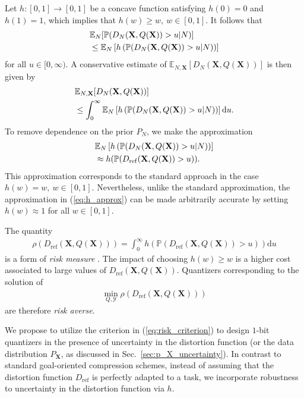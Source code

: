 \documentclass[conference]{IEEEtran}
\begin{document}
Let $h: [0,1] \rightarrow [0,1]$ be a concave function satisfying $h(0) = 0$ and $h(1) = 1$, which implies that $h(w) \geq w,~w \in [0,1]$. It follows that
\begin{align}
	&\mathbb{E}_N[\mathbb{P}(D_N(\mathbf{X},Q(\mathbf{X})) > u|N)]\notag\\
	&\leq \mathbb{E}_N\left[h\left(\mathbb{P}(D_N(\mathbf{X},Q(\mathbf{X})) > u|N)\right)\right]
\end{align}
for all $u \in [0,\infty)$. A conservative estimate of $\mathbb{E}_{N,\mathbf{X}}[D_N(\mathbf{X},Q(\mathbf{X}))]$ is then given by 
\begin{align}
	&\mathbb{E}_{N,\mathbf{X}}[D_N(\mathbf{X},Q(\mathbf{X}))]\notag\\ 
	&\leq \int_0^{\infty} \mathbb{E}_N\left[h\left(\mathbb{P}(D_N(\mathbf{X},Q(\mathbf{X})) > u|N)\right)\right]\mathrm{d}u.
\end{align}
To remove dependence on the prior $P_N$, we make the approximation 
\begin{align}\label{eq:h_approx}
	&\mathbb{E}_N\left[h\left(\mathbb{P}(D_N(\mathbf{X},Q(\mathbf{X})) > u|N)\right)\right]\notag\\
	&\approx h(\mathbb{P}(D_{\mathrm{ref}}(\mathbf{X},Q(\mathbf{X})) > u)).
\end{align}
This approximation corresponds to the standard approach in the case $h(w) = w,~w \in [0,1]$. Nevertheless, unlike the standard approximation, the approximation in (\ref{eq:h_approx}) can be made arbitrarily accurate by setting $h(w) \approx 1$ for all $w \in [0,1]$. 

The quantity 
\begin{align}
	\rho(D_{\mathrm{ref}}(\mathbf{X},Q(\mathbf{X}))) = \int_0^{\infty} h(\mathbb{P}(D_{\mathrm{ref}}(\mathbf{X},Q(\mathbf{X})) > u))\mathrm{d}u
\end{align}
is a form of \textit{risk measure} \cite{Serada2010distortion}. The impact of choosing $h(w) \geq w$ is a higher cost associated to large values of $D_{\mathrm{ref}}(\mathbf{X},Q(\mathbf{X}))$. Quantizers corresponding to the solution of 
\begin{align}\label{eq:risk_criterion}
	\min_{Q,\mathcal{Y}} 	\rho(D_{\mathrm{ref}}(\mathbf{X},Q(\mathbf{X})))
\end{align} 
are therefore \textit{risk averse}. 

We propose to utilize the criterion in (\ref{eq:risk_criterion}) to design $1$-bit quantizers in the presence of uncertainty in the distortion function (or the data distribution $P_{\mathbf{X}}$, as discussed in Sec.~\ref{sec:p_X_uncertainty}). In contrast to standard goal-oriented compression schemes, instead of assuming that the distortion function $D_{\mathrm{ref}}$ is perfectly adapted to a task, we incorporate robustness to uncertainty in the distortion function via $h$. 
\end{document}
